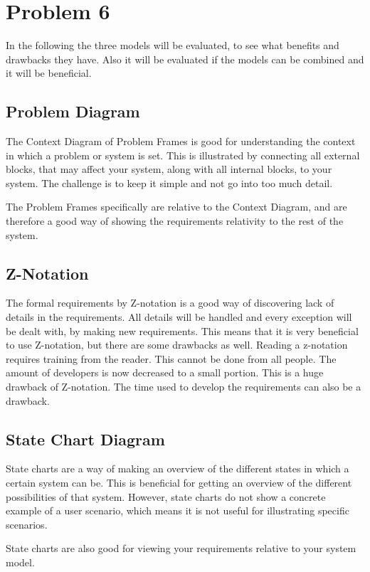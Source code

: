 \chapter{Problem 6}

In the following the three models will be evaluated, to see what benefits and drawbacks they have. Also it will be evaluated if the models can be combined and it will be beneficial.

\section{Problem Diagram}
The Context Diagram of Problem Frames is good for understanding the context in which a problem or system is set. This is illustrated by connecting all external blocks, that may affect your system, along with all internal blocks, to your system. The challenge is to keep it simple and not go into too much detail.

The Problem Frames specifically are relative to the Context Diagram, and are therefore a good way of showing the requirements relativity to the rest of the system.


\section{Z-Notation}
The formal requirements by Z-notation is a good way of discovering lack of details in the requirements. All details will be handled and every exception will be dealt with, by making new requirements. This means that it is very beneficial to use Z-notation, but there are some drawbacks as well. Reading a z-notation requires training from the reader. This cannot be done from all people. The amount of developers is now decreased to a small portion. This is a huge drawback of Z-notation. The time used to develop the requirements can also be a drawback.




\section{State Chart Diagram}
State charts are a way of making an overview of the different states in which a certain system can be. This is beneficial for getting an overview of the different possibilities of that system. However, state charts do not show a concrete example of a user scenario, which means it is not useful for illustrating specific scenarios.

State charts are also good for viewing your requirements relative to your system model.